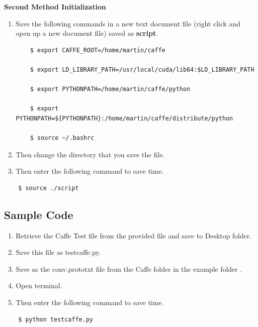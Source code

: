\documentclass[12pt]{article}
\begin{document}
\textbf{Second Method Initialization}

\begin{enumerate}
     \item Save the following commands in a new text document file (right click and open up a new document file) saved as \textbf{script}.

\begin{lstlisting}
    $ export CAFFE_ROOT=/home/martin/caffe

    $ export LD_LIBRARY_PATH=/usr/local/cuda/lib64:$LD_LIBRARY_PATH

    $ export PYTHONPATH=/home/martin/caffe/python

    $ export PYTHONPATH=${PYTHONPATH}:/home/martin/caffe/distribute/python

    $ source ~/.bashrc

\end{lstlisting}

     \item Then change the directory that you save the file.
     \item Then enter the following command to save time.
\end{enumerate}

\begin{lstlisting}
    $ source ./script
\end{lstlisting}

\subsection{Sample Code}

\begin{enumerate}
     \item Retrieve the Caffe Test file from the provided file and save to Desktop folder.
     \item Save this file as testcaffe.py.
     \item Save as the conv.prototxt file from the Caffe folder in the example folder .
     \item Open terminal.
     \item Then enter the following command to save time.
\end{enumerate}

\begin{lstlisting}
    $ python testcaffe.py
\end{lstlisting}
\newpage
\end{document}
